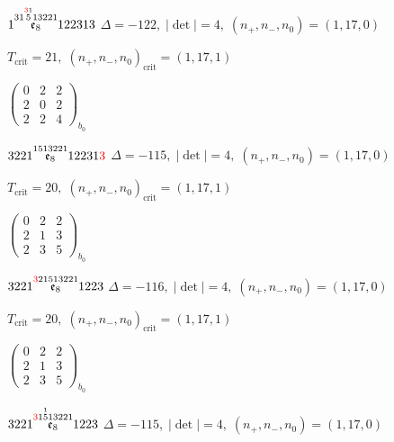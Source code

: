 \documentclass[10pt]{article}
\begin{document}
\smallskip

$1\overset{31\overset{\textcolor{red}{3}1}{5}13221}{\mathfrak{e}_8}122313$ \quad $\Delta=-122,\; |\det|=4,\; (n_+,n_-,n_0)=(1,17,0)$

\hspace{1em}$T_{\text{crit}}=21,\; (n_+,n_-,n_0)_{\text{crit}}=(1,17,1)$

\hspace{2em}$\left(\begin{smallmatrix}0 & 2 & 2 \\ 2 & 0 & 2 \\ 2 & 2 & 4\end{smallmatrix}\right)_{\!b_0}$

\smallskip

$3221\overset{1513221}{\mathfrak{e}_8}12231\textcolor{red}{3}$ \quad $\Delta=-115,\; |\det|=4,\; (n_+,n_-,n_0)=(1,17,0)$

\hspace{1em}$T_{\text{crit}}=20,\; (n_+,n_-,n_0)_{\text{crit}}=(1,17,1)$

\hspace{2em}$\left(\begin{smallmatrix}0 & 2 & 2 \\ 2 & 1 & 3 \\ 2 & 3 & 5\end{smallmatrix}\right)_{\!b_0}$

\smallskip

$3221\overset{\textcolor{red}{3}21513221}{\mathfrak{e}_8}1223$ \quad $\Delta=-116,\; |\det|=4,\; (n_+,n_-,n_0)=(1,17,0)$

\hspace{1em}$T_{\text{crit}}=20,\; (n_+,n_-,n_0)_{\text{crit}}=(1,17,1)$

\hspace{2em}$\left(\begin{smallmatrix}0 & 2 & 2 \\ 2 & 1 & 3 \\ 2 & 3 & 5\end{smallmatrix}\right)_{\!b_0}$

\smallskip

$3221\overset{\textcolor{red}{3}1\overset{1}{5}13221}{\mathfrak{e}_8}1223$ \quad $\Delta=-115,\; |\det|=4,\; (n_+,n_-,n_0)=(1,17,0)$
\end{document}
